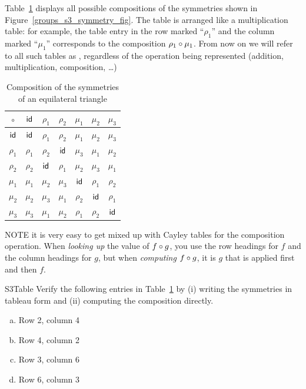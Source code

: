 \noindent
Table~\ref{S3_table} displays  all possible compositions of the symmetries shown in Figure~\ref{groups_s3_symmetry_fig}. The table is arranged like a multiplication table: for example, the table entry in the row marked ``$\rho_1$'' and the 
column marked ``$\mu_1$'' corresponds to the composition $\rho_1 \circ \mu_1$.  From now on we will refer to all such tables as , regardless of the operation being represented (addition, multiplication, composition, \ldots)

\begin{table}
{\small
\begin{center}
\begin{tabular}{c|cccccc}
$\circ$  & ${\sf{i}d}$     & $\rho_1$ & $\rho_2$ & $\mu_1$ & $\mu_2$ & $\mu_3$ \\
\hline
${\sf{i}d}$     & ${\sf{i}d}$     & $\rho_1$ & $\rho_2$ & $\mu_1$ & $\mu_2$ & $\mu_3$ \\
$\rho_1$ & $\rho_1$ & $\rho_2$ & ${\sf{i}d}$     & $\mu_3$ & $\mu_1$ & $\mu_2$ \\
$\rho_2$ & $\rho_2$ & ${\sf{i}d}$     & $\rho_1$ & $\mu_2$ & $\mu_3$ & $\mu_1$ \\
$\mu_1$  & $\mu_1$  & $\mu_2$  & $\mu_3$  & ${\sf{i}d}$    & $\rho_1$& $\rho_2$\\
$\mu_2$  & $\mu_2$  & $\mu_3$  & $\mu_1$  & $\rho_2$& ${\sf{i}d}$    & $\rho_1$\\
$\mu_3$  & $\mu_3$  & $\mu_1$  & $\mu_2$  & $\rho_1$& $\rho_2$& ${\sf{i}d}$
\end{tabular}
\end{center}
}
\caption{Composition of the symmetries of an equilateral triangle}
\label{S3_table}
\end{table}

\begin{rem}
NOTE it is very easy to get mixed up with Cayley tables for the composition operation. When \emph{looking up} the value of $f \circ g$, you use the row headings for $f$ and the column headings for  $g$, but when \emph{computing} $f \circ g$, it is $g$ that is applied first and then $f$.
\end{rem}

\begin{exercise}{S3Table}
Verify the following entries in Table~\ref{S3_table} by (i) writing the symmetries in tableau form and (ii) computing the composition directly.
\begin{enumerate}[(a)]
\item
Row 2, column 4
\item
Row 4, column 2
\item
Row 3, column 6
\item
Row 6, column 3
\end{enumerate}
\end{exercise}

